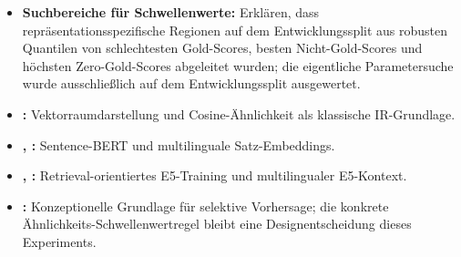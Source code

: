 \documentclass[11pt]{article}
\begin{document}
\begin{leitfragenbox}
\begin{itemize}
\begin{enumerate}
        \item \textit{Absoluter Schwellenwert:}
        \[
        S_{\theta}(q)=\{c\in\mathcal{C}\mid s(q,c)\geq\theta\}.
        \]
        Kann $[\,]$ oder mehrere Chunks zur\"uckgeben.
        \item \textit{Top-$k$ + Schwellenwert:} Zunächst die Chunks, die den Schwellenwert überschreiten, nach Ähnlichkeitswert ordnen, dann h\"ochstens die ersten $k$ zur\"uckgeben. Damit werden absolute Filterung, Enthaltung und Begrenzung der Ausgabemenge kombiniert.
        \item \textit{Relative Marge:} Mit $s_k$ als Ähnlichkeitswert auf Rang $k$ und $s_{k+1}$ als folgendem Ähnlichkeitswert gilt
        \[
        m_k(q)=\frac{s_k-s_{k+1}}{\max(|s_k|,10^{-12})}.
        \]
        Top-$k$ wird nur ausgegeben, wenn $m_k(q)\geq\gamma$; andernfalls wird $[\,]$ vorhergesagt. F\"ur $k=1$ misst dies die relative Trennung zwischen Rang 1 und Rang 2.
    \end{enumerate}
    \item \textbf{Suchbereiche für Schwellenwerte:} Erkl\"aren, dass repr\"asentationsspezifische Regionen auf dem Entwicklungssplit aus robusten Quantilen von schlechtesten Gold-Scores, besten Nicht-Gold-Scores und höchsten Zero-Gold-Scores abgeleitet wurden; die eigentliche Parametersuche wurde ausschlie\ss lich auf dem Entwicklungssplit ausgewertet.
\end{itemize}
\end{leitfragenbox}

\begin{quellenbox}
\begin{itemize}
    \item \textbf{\citet{salton1975vector}:} Vektorraumdarstellung und Cosine-\"Ahnlichkeit als klassische IR-Grundlage.
    \item \textbf{\citet{reimers-gurevych-2019-sentence}, \citet{reimers-gurevych-2020-making}:} Sentence-BERT und multilinguale Satz-Embeddings.
    \item \textbf{\citet{wang2022text}, \citet{wang2024multilingual}:} Retrieval-orientiertes E5-Training und multilingualer E5-Kontext.
    \item \textbf{\citet{pmlr-v97-geifman19a}:} Konzeptionelle Grundlage f\"ur selektive Vorhersage; die konkrete Ähnlichkeits-Schwellenwertregel bleibt eine Designentscheidung dieses Experiments.
\end{itemize}
\end{quellenbox}
\end{document}
